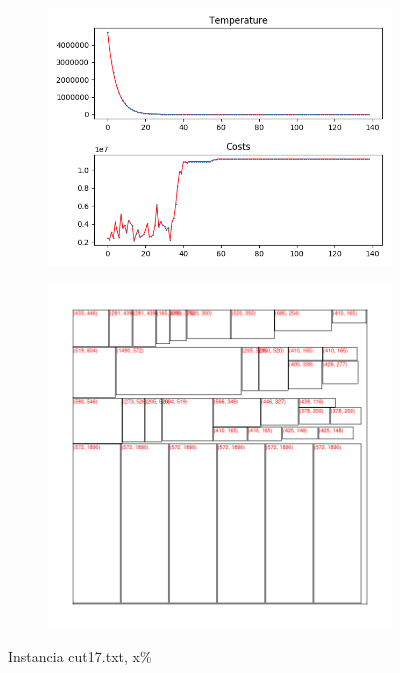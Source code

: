 \begin{figure}
\centering
\begin{subfigure}{.5\textwidth}
  \centering
  \includegraphics[width=1\linewidth]{results/cut17/1/plot}
  \label{fig:sub1}
\end{subfigure}%
\begin{subfigure}{.5\textwidth}
  \centering
  \includegraphics[width=1\linewidth]{results/cut17/1/cut}
  \label{fig:sub2}
\end{subfigure}
\caption{Instancia cut17.txt, x\%}
\label{fig:test}
\end{figure}


